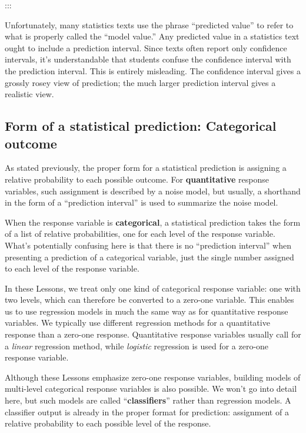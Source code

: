 \documentclass[
  letterpaper,
  DIV=11,
  numbers=noendperiod,
  oneside]{scrartcl}
\begin{document}
:::

Unfortunately, many statistics texts use the phrase ``predicted value''
to refer to what is properly called the ``model value.'' Any predicted
value in a statistics text ought to include a prediction interval. Since
texts often report only confidence intervals, it's understandable that
students confuse the confidence interval with the prediction interval.
This is entirely misleading. The confidence interval gives a grossly
rosey view of prediction; the much larger prediction interval gives a
realistic view.

\subsection{Form of a statistical prediction: Categorical
outcome}\label{form-of-a-statistical-prediction-categorical-outcome}

As stated previously, the proper form for a statistical prediction is
assigning a relative probability to each possible outcome. For
\textbf{quantitative} response variables, such assignment is described
by a noise model, but usually, a shorthand in the form of a ``prediction
interval'' is used to summarize the noise model.

When the response variable is \textbf{categorical}, a statistical
prediction takes the form of a list of relative probabilities, one for
each level of the response variable. What's potentially confusing here
is that there is no ``prediction interval'' when presenting a prediction
of a categorical variable, just the single number assigned to each level
of the response variable.

In these Lessons, we treat only one kind of categorical response
variable: one with two levels, which can therefore be converted to a
zero-one variable. This enables us to use regression models in much the
same way as for quantitative response variables. We typically use
different regression methods for a quantitative response than a zero-one
response. Quantitative response variables usually call for a
\emph{linear} regression method, while \emph{logistic} regression is
used for a zero-one response variable.

Although these Lessons emphasize zero-one response variables, building
models of multi-level categorical response variables is also possible.
We won't go into detail here, but such models are called
``\textbf{classifiers}'' rather than regression models. A classifier
output is already in the proper format for prediction: assignment of a
relative probability to each possible level of the response.
\end{document}
